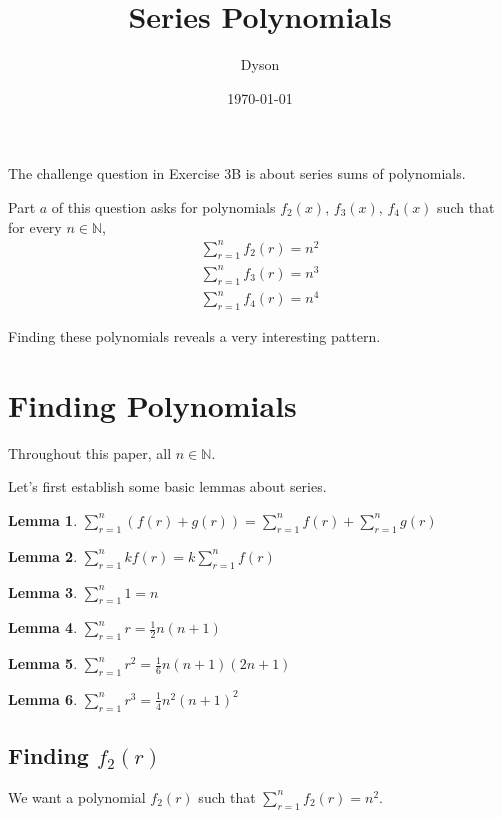\documentclass[a4paper]{article}
\title{Series Polynomials}
\author{Dyson}
\date{\today}
\newcommand{\sn}{\sum\limits_{r=1}^{n}}
\newcommand{\inn}{\in \mathbb{N}}
\newcommand{\oo}[1]{\frac{1}{#1}}
\newtheorem{lemma}{Lemma}
\begin{document}
\maketitle

\setlength{\parindent}{0em}
\setlength{\parskip}{1em}

The challenge question in Exercise 3B is about series sums of polynomials.

Part $a$ of this question asks for polynomials $f_2(x)$, $f_3(x)$, $f_4(x)$ such that for every $n \inn$,
\begin{gather*}
\sn f_2(r) = n^2\\
\sn f_3(r) = n^3\\
\sn f_4(r) = n^4
\end{gather*}

Finding these polynomials reveals a very interesting pattern.

\section{Finding Polynomials}

Throughout this paper, all $n \inn$.

Let's first establish some basic lemmas about series.

\begin{lemma}
$\sn (f(r) + g(r)) = \sn f(r) + \sn g(r)$
\end{lemma}

\begin{lemma}
$\sn kf(r) = k \sn f(r)$
\end{lemma}

\begin{lemma}
$\sn 1 = n$
\end{lemma}

\begin{lemma}
$\sn r = \oo{2}n(n + 1)$
\end{lemma}

\begin{lemma}
$\sn r^2 = \oo{6}n(n + 1)(2n + 1)$
\end{lemma}

\begin{lemma}
$\sn r^3 = \oo{4}n^2(n + 1)^2$
\end{lemma}

\subsection{Finding $f_2(r)$}
We want a polynomial $f_2(r)$ such that $\sn f_2(r) = n^2$.
\end{document}
